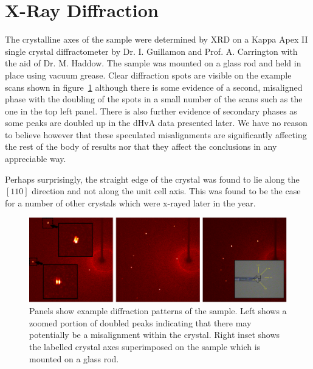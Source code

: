 
\section{X-Ray Diffraction}
    \label{Sec:ResD:XrayDiffraction}

The crystalline axes of the sample were determined by \acf{XRD} on a Kappa Apex II single crystal diffractometer by Dr. I. Guillamon and Prof. A. Carrington with the aid of Dr. M. Haddow. The sample was mounted on a glass rod and held in place using vacuum grease. Clear diffraction spots are visible on the example scans shown in figure~\ref{Fig:ResD:XRayDiffraction} although there is some evidence of a second, misaligned phase with the doubling of the spots in a small number of the scans such as the one in the top left panel. There is also further evidence of secondary phases as some peaks are doubled up in the dHvA data presented later. We have no reason to believe however that these speculated misalignments are significantly affecting the rest of the body of results nor that they affect the conclusions in any appreciable way.

Perhaps surprisingly, the straight edge of the crystal was found to lie along the $[110]$ direction and not along the unit cell axis. This was found to be the case for a number of other \BaFeAsP{} crystals which were x-rayed later in the year.

\begin{figure}[htbp]
    \begin{center}
        \includegraphics[scale=0.7]{Chapter-dHvABaFe2P2/Figures/Xrays/XRayDiffraction/XRayDiffraction}
        \caption{Panels show example diffraction patterns of the \BaFeP{} sample. Left shows a zoomed portion of doubled peaks indicating that there may potentially be a misalignment within the crystal. Right inset shows the labelled crystal axes superimposed on the sample which is mounted on a glass rod.}
        \label{Fig:ResD:XRayDiffraction}
    \end{center}
\end{figure}

